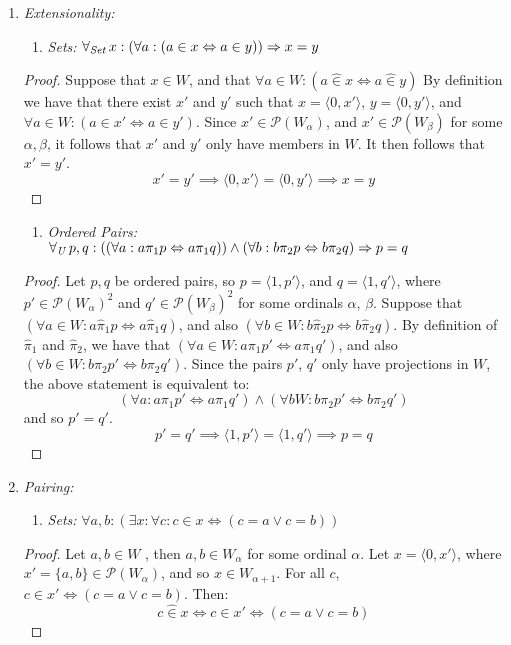 \documentclass[11pt]{report}
\newcommand{\all}[1]{\forall_{\mathit{#1}}\hspace{0.5mm}}
\newcommand{\pleft}{\mathrel{\pi_1}}
\newcommand{\pright}{\mathrel{\pi_2}}
\newcommand{\pair}[2]{\langle #1,#2 \rangle}
\newcommand{\zin}{\mathrel{\widehat{\in}}}
\newcommand{\zpright}{\mathrel{\widehat{\pi}_2}}
\newcommand{\zpleft}{\mathrel{\widehat{\pi}_1}}
\theoremstyle{definition}
\theoremstyle{theorem}
\theoremstyle{lemma}
\begin{document}
\begin{enumerate}[resume=axiomlist, label=\Roman*.]
  \item \textit{Extensionality:}
  \begin{enumerate}[series=sublist, label=(\roman*)]
    \item \textit{Sets:} $\all{Set} x: (\forall a: (a\in x \Leftrightarrow a\in y)) \Rightarrow x=y$
  \end{enumerate}
  \begin{proof}
    Suppose that $x\in W$, and that $\forall a\in W: (a \zin x \Leftrightarrow a\zin y)$
    By definition we have that there exist $x'$ and $y'$ such that $x=\pair{0}{x'}$, $y = \pair{0}{y'}$, and $\forall a\in W: (a\in x' \Leftrightarrow a\in y')$. 
    Since $x'\in\mathcal{P}(W_\alpha)$, and $x'\in\mathcal{P}(W_\beta)$ for some $\alpha, \beta$, it follows that $x'$ and $y'$ only have members in $W$. 
    It then follows that $x'=y'$.
    $$x'=y'\implies \pair{0}{x'} = \pair{0}{y'} \implies x = y$$
  \end{proof}
  \begin{enumerate}[resume=sublist, label=(\roman*)]
    \item \textit{Ordered Pairs:}
    $\all{U}p,q: ((\forall a: a\pi_1 p \Leftrightarrow a\pi_1 q))\wedge(\forall b: b\pi_2 p \Leftrightarrow b\pi_2 q)\Rightarrow p=q$
  \end{enumerate}
  \begin{proof}
  Let $p,q$ be ordered pairs, so $p = \pair{1}{p'}$, and $q= \pair{1}{q'}$, where $p'\in \mathcal{P}(W_\alpha)^2$ and $q'\in \mathcal{P}(W_\beta)^2$ for some ordinals $\alpha$, $\beta$.
  Suppose that $(\forall a\in W: a\zpleft p \Leftrightarrow a\zpleft q)$, and also $(\forall b\in W: b\zpright p \Leftrightarrow b\zpright q)$.
  By definition of $\zpleft$ and $\zpright$, we have that $(\forall a\in W: a\pleft p' \Leftrightarrow a\pleft q')$, and also $(\forall b\in W: b\pright p' \Leftrightarrow b\pright q')$.
  Since the pairs $p'$, $q'$ only have projections in $W$, the above statement is equivalent to: $$(\forall a: a\pleft p' \Leftrightarrow a\pleft q')\wedge(\forall bW: b\pright p' \Leftrightarrow b\pright q')$$
  and so $p'=q'$.
  $$p'=q' \implies \pair{1}{p'} = \pair{1}{q'} \implies p = q$$
  \end{proof}
  \item \textit{Pairing:}
  \begin{enumerate}[series=sublist, label=(\roman*)]
    \item \textit{Sets:}
    $\forall a,b: (\exists x: \forall c: c\in x \Leftrightarrow (c=a \vee c=b))$
  \end{enumerate}
  \begin{proof}
    Let $a,b\in W$ , then $a,b\in W_\alpha$ for some ordinal $\alpha$.
    Let $x = \pair{0}{x'}$, where $x'=\{a,b\} \in \mathcal{P}(W_\alpha)$, and so $x\in W_{\alpha+1}$.
    For all $c$, $c\in x' \Leftrightarrow (c=a \vee c=b)$.
    Then:
      $$c\zin x \iff c\in x' \iff (c = a \vee c = b)$$
  \end{proof}


\end{enumerate}
\end{document}
